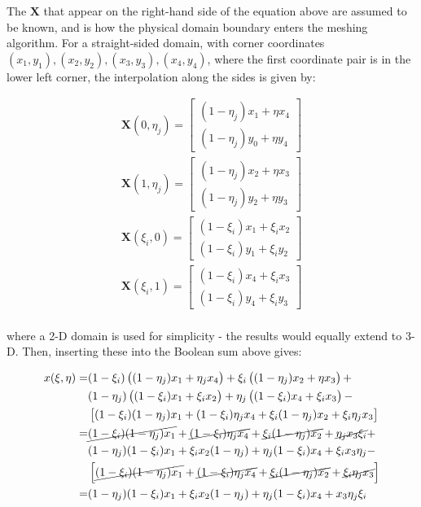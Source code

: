 \documentclass[10pt]{article}
\begin{document}
The \(\textbf{X}\) that appear on the right-hand side of the equation above are assumed to be known, and is how the physical domain boundary enters the meshing algorithm. For a straight-sided domain, with corner coordinates \((x_1,y_1), (x_2,y_2), (x_3,y_3), (x_4, y_4)\), where the first coordinate pair is in the lower left corner, the interpolation along the sides is given by:

\begin{equation}
\begin{aligned}
\textbf{X}(0,\eta_j)=\begin{bmatrix}(1-\eta_j)x_1+\eta x_4\\ (1-\eta_j)y_0+\eta y_4\end{bmatrix}\\
\textbf{X}(1,\eta_j)=\begin{bmatrix}(1-\eta_j)x_2+\eta x_3\\ (1-\eta_j)y_2+\eta y_3\end{bmatrix}\\
\textbf{X}(\xi_i,0)=\begin{bmatrix}(1-\xi_i)x_1+\xi_i x_2\\ (1-\xi_i)y_1+\xi_i y_2\end{bmatrix}\\
\textbf{X}(\xi_i,1)=\begin{bmatrix}(1-\xi_i)x_4+\xi_i x_3\\ (1-\xi_i)y_4+\xi_i y_3\end{bmatrix}\\
\end{aligned}
\end{equation}

where a 2-D domain is used for simplicity - the results would equally extend to 3-D. Then, inserting these into the Boolean sum above gives:

\begin{equation}
\begin{aligned}
x(\xi,\eta)=& (1-\xi_i)\left((1-\eta_j)x_1+\eta_j x_4\right)+\xi_i\left((1-\eta_j)x_2+\eta x_3\right) + \\
&(1-\eta_j)\left((1-\xi_i)x_1+\xi_i x_2\right)+\eta_j\left((1-\xi_i)x_4+\xi_i x_3\right) - \\
& \left\lbrack(1-\xi_i)(1-\eta_j)x_1+(1-\xi_i)\eta_jx_4+\xi_i(1-\eta_j)x_2+\xi_i\eta_jx_3\right\rbrack\\
=& \cancel{(1-\xi_i)(1-\eta_j)x_1}+\cancel{(1-\xi_i)\eta_j x_4}+\cancel{\xi_i(1-\eta_j)x_2}+\cancel{\eta_j x_3\xi_i} +\\
&(1-\eta_j)(1-\xi_i)x_1+\xi_i x_2(1-\eta_j)+\eta_j(1-\xi_i)x_4+\xi_i x_3\eta_j-\\
& \left\lbrack\cancel{(1-\xi_i)(1-\eta_j)x_1}+\cancel{(1-\xi_i)\eta_jx_4}+\cancel{\xi_i(1-\eta_j)x_2}+\cancel{\xi_i\eta_jx_3}\right\rbrack\\
=& (1-\eta_j)(1-\xi_i)x_1+\xi_i x_2(1-\eta_j)+\eta_j(1-\xi_i)x_4+x_3\eta_j\xi_i\\
\end{aligned}
\end{equation}
\end{document}
